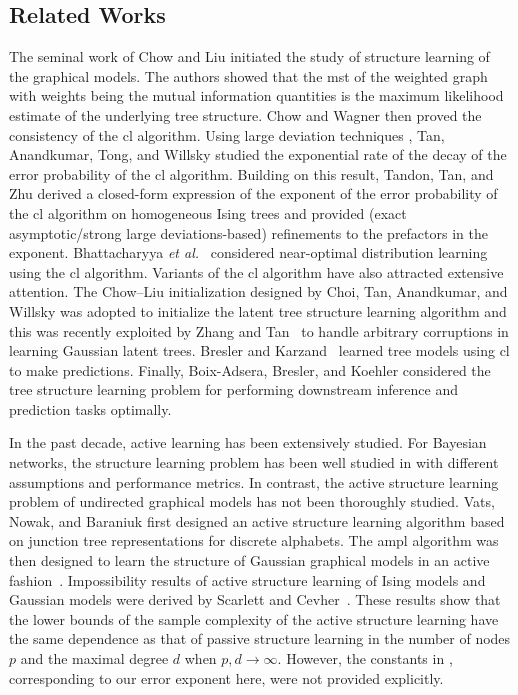 \subsection{Related Works}
The seminal work of Chow and Liu\cite{chow1968approximating} initiated the study of   structure learning of the graphical models. The authors showed that the \ac{mst} of the weighted  graph with weights being the  mutual information quantities is the maximum likelihood estimate of the underlying tree structure. Chow and Wagner  \cite{chow1973consistency} then proved the consistency of the \ac{cl} algorithm. Using large deviation techniques \cite{zeitouni1998large}, Tan, Anandkumar, Tong, and Willsky\cite{tan2011large} studied the exponential rate of the decay of the error probability of the \ac{cl} algorithm. Building on this result, Tandon, Tan, and Zhu\cite{tandon2020exact} derived a closed-form expression of the exponent of the error probability of the \ac{cl} algorithm on homogeneous Ising trees and provided (exact asymptotic/strong large deviations-based) refinements to the prefactors in the exponent. Bhattacharyya {\em et al.}~\cite{bha21} considered near-optimal distribution learning using the \ac{cl} algorithm. Variants of the \ac{cl} algorithm have also attracted extensive attention. The Chow--Liu initialization designed by Choi, Tan, Anandkumar, and Willsky \cite{choi2011learning} was adopted to initialize the latent tree structure learning algorithm and this was recently exploited by Zhang and Tan~\cite{zhang21} to handle arbitrary corruptions in learning Gaussian latent trees.  Bresler and Karzand~\cite{bresler2020learning} learned tree models using \ac{cl} to make predictions. Finally,  Boix-Adsera, Bresler, and Koehler\cite{boix2021chow} considered the tree structure learning problem for performing downstream inference  and prediction tasks optimally.

In the past decade, active learning has been extensively studied\cite{hanneke2009theoretical,naghshvar2013active}. For Bayesian networks,  the structure learning problem has been well studied in \cite{tong2001active, he2008active, li2009active, squires2020active, ben2021active} with different assumptions and performance metrics. In contrast, the active structure learning problem of undirected graphical models has not been thoroughly studied. Vats, Nowak, and Baraniuk\cite{vats2014active} first designed an active structure learning algorithm based on junction tree representations for discrete alphabets. The \ac{ampl} algorithm was then designed to learn the structure of Gaussian graphical models in an active fashion~\cite{dasarathy2016active}. Impossibility results of active structure learning of Ising models and Gaussian models were derived by Scarlett and Cevher~\cite{scarlett2017lower}. These results  show  that the lower bounds of the sample complexity of the active structure learning have the same dependence as that of   passive structure learning in the number of nodes $p$ and the maximal degree $d$ when $p,d\rightarrow\infty$. However, the constants in \cite{scarlett2017lower}, corresponding to our error exponent here,  were not provided explicitly. 

